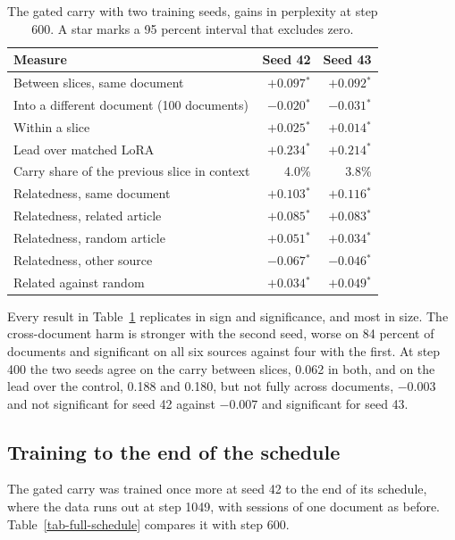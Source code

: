 \documentclass[12pt,a4paper]{report}
\newcommand{\sig}{$^{*}$}
\begin{document}
\begin{table}[H]
  \centering
  \caption{The gated carry with two training seeds, gains in perplexity at step 600. A star marks a 95 percent interval that excludes zero.}
  \label{tab-seeds}
  \small
  \begin{tabular}{lrr}
    \toprule
    Measure & Seed 42 & Seed 43 \\
    \midrule
    Between slices, same document & $+0.097$\sig & $+0.092$\sig \\
    Into a different document (100 documents) & $-0.020$\sig & $-0.031$\sig \\
    Within a slice & $+0.025$\sig & $+0.014$\sig \\
    Lead over matched LoRA & $+0.234$\sig & $+0.214$\sig \\
    Carry share of the previous slice in context & 4.0\% & 3.8\% \\
    \midrule
    Relatedness, same document & $+0.103$\sig & $+0.116$\sig \\
    Relatedness, related article & $+0.085$\sig & $+0.083$\sig \\
    Relatedness, random article & $+0.051$\sig & $+0.034$\sig \\
    Relatedness, other source & $-0.067$\sig & $-0.046$\sig \\
    Related against random & $+0.034$\sig & $+0.049$\sig \\
    \bottomrule
  \end{tabular}
\end{table}

Every result in Table~\ref{tab-seeds} replicates in sign and significance, and most in size. The cross-document harm is stronger with the second seed, worse on 84 percent of documents and significant on all six sources against four with the first. At step 400 the two seeds agree on the carry between slices, 0.062 in both, and on the lead over the control, 0.188 and 0.180, but not fully across documents, $-0.003$ and not significant for seed 42 against $-0.007$ and significant for seed 43.

\subsection{Training to the end of the schedule}
\label{sec-full}

The gated carry was trained once more at seed 42 to the end of its schedule, where the data runs out at step 1049, with sessions of one document as before. Table~\ref{tab-full-schedule} compares it with step 600.
\end{document}
